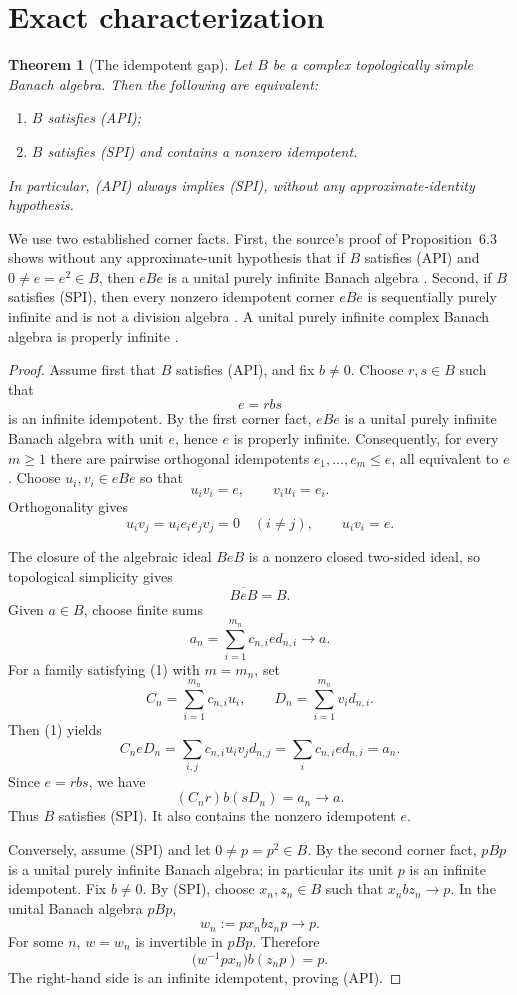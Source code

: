 \documentclass[11pt]{article}
\newtheorem{theorem}{Theorem}
\begin{document}
\section{Exact characterization}

\begin{theorem}[The idempotent gap]
\label{thm:main}
Let $B$ be a complex topologically simple Banach algebra.  Then the following
are equivalent:
\begin{enumerate}
\item $B$ satisfies \emph{(API)};
\item $B$ satisfies \emph{(SPI)} and contains a nonzero idempotent.
\end{enumerate}
In particular, \emph{(API)} always implies \emph{(SPI)}, without any
approximate-identity hypothesis.
\end{theorem}

We use two established corner facts.  First, the source's proof of
Proposition~6.3 shows without any approximate-unit hypothesis that if $B$
satisfies (API) and $0\ne e=e^2\in B$, then $eBe$ is a unital purely infinite
Banach algebra \cite[Proposition~6.3(2), implication (a)$\Rightarrow$(c)]{BKM}.
Second, if $B$ satisfies (SPI), then every nonzero idempotent corner $eBe$ is
sequentially purely infinite and is not a division algebra
\cite[Lemmas~3.1--3.2 and Corollary~3.3]{CMR}.  A unital purely infinite
complex Banach algebra is properly infinite
\cite[Lemma~1.2]{DH}.

\begin{proof}
Assume first that $B$ satisfies (API), and fix $b\ne0$.  Choose $r,s\in B$
such that
\[
e=rbs
\]
is an infinite idempotent.  By the first corner fact, $eBe$ is a unital
purely infinite Banach algebra with unit $e$, hence $e$ is properly infinite.
Consequently, for every $m\ge1$ there are pairwise orthogonal idempotents
$e_1,\ldots,e_m\le e$, all equivalent to $e$.  Choose $u_i,v_i\in eBe$ so
that
\[
u_i v_i=e,\qquad v_i u_i=e_i.
\]
Orthogonality gives
\[
u_i v_j=u_i e_i e_jv_j=0\quad(i\ne j),
\qquad u_i v_i=e.
\tag{1}
\]

The closure of the algebraic ideal $BeB$ is a nonzero closed two-sided ideal,
so topological simplicity gives
\[
\overline{BeB}=B.
\tag{2}
\]
Given $a\in B$, choose finite sums
\[
a_n=\sum_{i=1}^{m_n}c_{n,i}e d_{n,i}\longrightarrow a.
\]
For a family satisfying (1) with $m=m_n$, set
\[
C_n=\sum_{i=1}^{m_n}c_{n,i}u_i,
\qquad
D_n=\sum_{i=1}^{m_n}v_i d_{n,i}.
\]
Then (1) yields
\[
C_neD_n=\sum_{i,j}c_{n,i}u_i v_jd_{n,j}
=\sum_i c_{n,i}e d_{n,i}=a_n.
\]
Since $e=rbs$, we have
\[
(C_nr)b(sD_n)=a_n\longrightarrow a.
\]
Thus $B$ satisfies (SPI).  It also contains the nonzero idempotent $e$.

Conversely, assume (SPI) and let $0\ne p=p^2\in B$.  By the second corner
fact, $pBp$ is a unital purely infinite Banach algebra; in particular its unit
$p$ is an infinite idempotent.  Fix $b\ne0$.  By (SPI), choose $x_n,z_n\in B$
such that $x_nbz_n\to p$.  In the unital Banach algebra $pBp$,
\[
w_n:=px_nbz_np\longrightarrow p.
\]
For some $n$, $w=w_n$ is invertible in $pBp$.  Therefore
\[
\bigl(w^{-1}px_n\bigr)b(z_np)=p.
\]
The right-hand side is an infinite idempotent, proving (API).
\end{proof}
\end{document}
